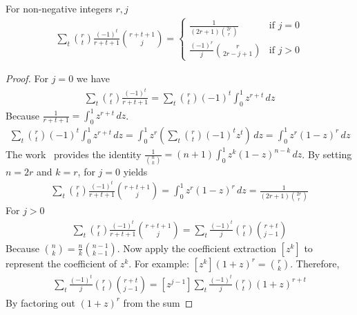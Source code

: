 \begin{lemma}
    \label{lem:piecewise-binomial-identity}
    For non-negative integers $r, j$
    \begin{align*}
        \sum_{t} \binom{r}{t} \frac{(-1)^t}{r+t+1} \binom{r+t+1}{j}
        = \begin{cases}
              \displaystyle \frac{1}{(2r+1) \binom{2r}{r}} & \text{if } j=0 \\[0.8em]
              \displaystyle \frac{(-1)^r}{j} \binom{r}{2r-j+1} & \text{if } j>0
        \end{cases}
    \end{align*}
    \begin{proof}
        For $j=0$ we have
        \begin{align*}
            \sum_t \binom{r}{t} \frac{(-1)^t}{r+t+1} = \sum_t \binom{r}{t} (-1)^t \int_0^1 z^{r+t} \, dz
        \end{align*}
        Because $\frac{1}{r+t+1} = \int_0^1 z^{r+t} \, dz$.
        \begin{align*}
            \sum_t \binom{r}{t} (-1)^t \int_0^1 z^{r+t} \, dz
            = \int_0^1 z^r \left( \sum_t \binom{r}{t} (-1)^t z^{t} \right) \, dz
            = \int_0^1 z^r (1 - z)^r \, dz
        \end{align*}
        The work~\cite{sury2004identities} provides the identity $\frac{1}{\binom{n}{k}}=(n+1)\int_0^1 z^k(1-z)^{n-k}\,dz$.
        By setting $n=2r$ and $k=r$, for $j=0$ yields
        \begin{align*}
            \sum_t \binom{r}{t} \frac{(-1)^t}{r+t+1} \binom{r+t+1}{j} = \int_0^1 z^r (1-z)^{r}\,dz = \frac{1}{(2r+1) \binom{2r}{r}}
        \end{align*}
        For $j > 0$
        \begin{align*}
            \sum_t \binom{r}{t} \frac{(-1)^t}{r+t+1} \binom{r+t+1}{j} =  \sum_t \frac{(-1)^t}{j} \binom{r}{t} \binom{r+t}{j-1}
        \end{align*}
        Because $\binom{n}{k} = \frac{n}{k} \binom{n-1}{k-1}$.
        Now apply the coefficient extraction $[z^k]$ to represent the coefficient of $z^k$.
        For example: $[z^k] (1+z)^r = \binom{r}{k}$.
        Therefore,
        \begin{align*}
            \sum_t \frac{(-1)^t}{j}  \binom{r}{t} \binom{r+t}{j-1}
            = [z^{j-1}] \sum_t \frac{(-1)^t}{j} \binom{r}{t} (1+z)^{r+t}
        \end{align*}
        By factoring out $(1+z)^r$ from the sum

\end{proof}
\end{lemma}

